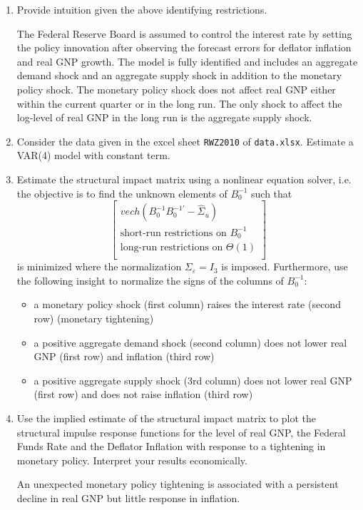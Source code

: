 \documentclass[a4paper]{scrartcl}
\begin{document}
    \begin{enumerate}
        \item Provide intuition given the above identifying restrictions.
              \begin{solution}
                  The Federal Reserve Board is assumed to control the interest rate by setting the policy innovation after observing the forecast errors for deflator inflation and real GNP growth. The model is fully identified and includes an aggregate demand shock and an aggregate supply shock in addition to the monetary policy shock. The monetary policy shock does not affect real GNP either within the current quarter or in the long run. The only shock to affect the log-level of real GNP in the long run is the aggregate supply shock. 
              \end{solution}
        \item Consider the data given in the excel sheet \texttt{RWZ2010} of \texttt{data.xlsx}. Estimate a VAR(4) model with constant term.
        \item Estimate the structural impact matrix using a nonlinear equation solver, i.e. the objective is to find the unknown elements of $B_0^{-1}$ such that
              $$\begin{bmatrix}
                      vech(B_0^{-1}B_0^{-1'}-\hat{\Sigma}_u)    \\
                      \text{short-run restrictions on }B_0^{-1} \\
                      \text{long-run restrictions on }\Theta(1) \\
                  \end{bmatrix}$$
              is minimized where the normalization $\Sigma_\varepsilon=I_3$ is imposed. Furthermore, use the following insight to normalize the signs of the columns of $B_0^{-1}$:
              \begin{itemize}
                  \item a monetary policy shock (first column) raises the interest rate (second row) (monetary tightening)
                  \item a positive aggregate demand shock (second column) does not lower real GNP (first row) and inflation (third row)
                  \item a positive aggregate supply shock (3rd column) does not lower real GNP (first row) and does not raise inflation (third row)
              \end{itemize}
        \item Use the implied estimate of the structural impact matrix to plot the structural impulse response functions for the level of real GNP, the Federal Funds Rate and the Deflator Inflation with response to a tightening in monetary policy. Interpret your results economically.
              \begin{solution}
                  An unexpected monetary policy tightening is associated with a persistent decline in real GNP but little response in inflation.
              \end{solution}
    \end{enumerate}
    \newpage
    
\end{document}
